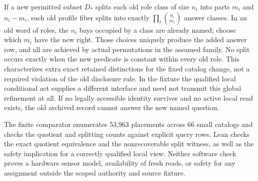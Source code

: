 \documentclass[11pt]{article}
\begin{document}
If a new permitted subset $D_*$ splits each old role class
of size $n_i$ into parts $m_i$ and $n_i-m_i$, each old profile
fiber splits into exactly $\prod_i {n_i\choose m_i}$ answer
classes. In an old word of roles, the $n_i$ bays occupied by a
class are already named; choose which $m_i$ have the new right.
Those choices uniquely produce the added answer row, and all
are achieved by actual permutations in the assumed family.
No split occurs exactly when the new predicate is constant
within every old role. This characterizes extra exact retained
distinctions for the fixed catalog change, not a required
violation of the old disclosure rule. In the fixture the
qualified local conditional act supplies a different interface
and need not transmit this global refinement at all. If no
legally accessible identity survives and no active local
read exists, the old archived record cannot answer the new
named question.

The finite comparator enumerates 53,963 placements across
66 small catalogs and checks the quotient and splitting counts
against explicit query rows. Lean checks the exact quotient
equivalence and the nonrecoverable split witness, as well as
the safety implication for a correctly qualified local view.
Neither software check proves a hardware sensor model,
availability of fresh reads, or safety for any assignment
outside the scoped authority and source fixture.
\end{document}

